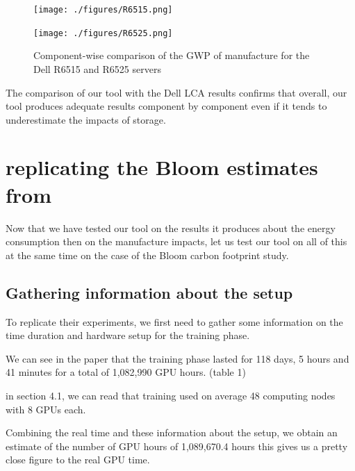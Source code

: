 \documentclass[11pt]{article}
\begin{document}
\begin{figure}[t]
  \centering
  \begin{minipage}{.47\linewidth}
  \texttt{[image: ./figures/R6515.png]} 
  \end{minipage}
  \hspace{.06\linewidth}
  \begin{minipage}{.47\linewidth}
  \texttt{[image: ./figures/R6525.png]} 
  \end{minipage}                                                                                                                              
  \label{fig:R6515_R6525}
  \caption{Component-wise comparison of the GWP of manufacture for the Dell R6515 and R6525 servers}
\end{figure}


The comparison of our tool with the Dell \gls{LCA} results confirms
that overall, our tool produces adequate results component by
component even if it tends to
underestimate the impacts of storage. 

\section{replicating the Bloom estimates from \cite{Luccioni2022estimating}}
\label{sec:org32e8a1b}
\label{sec:bloom}
Now that we have tested our tool on the results it produces about the
energy consumption then on the manufacture impacts, let us test our
tool on all of this at the same time on the case of the Bloom carbon
footprint study.
\subsection{Gathering information about the setup}
\label{sec:org5ed1958}
To replicate their experiments, we first need to gather some
information on the time duration and hardware setup for the training
phase.

We can see in the paper that the training phase lasted for 118 days, 5
hours and 41 minutes for a total of 1,082,990 GPU hours. (table 1)

in section 4.1, we can read that training used on average 48 computing
nodes with 8 GPUs each.


Combining the real time and these information about the setup, we obtain an estimate of the number of GPU hours of 1,089,670.4 hours
this gives us a pretty close figure to the real GPU time.
\end{document}
